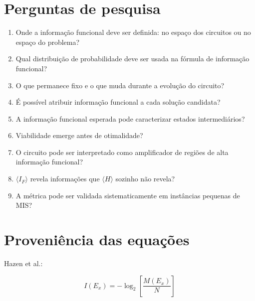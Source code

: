 \documentclass[11pt,a4paper]{article}
\begin{document}
\section{Perguntas de pesquisa}

\begin{enumerate}[leftmargin=1.6em]

    \item Onde a informação funcional deve ser definida:
    no espaço dos circuitos ou no espaço do problema?

    \item Qual distribuição de probabilidade deve ser usada
    na fórmula de informação funcional?

    \item O que permanece fixo e o que muda durante
    a evolução do circuito?

    \item É possível atribuir informação funcional
    a cada solução candidata?

    \item A informação funcional esperada pode caracterizar
    estados intermediários?

    \item Viabilidade emerge antes de otimalidade?

    \item O circuito pode ser interpretado como amplificador
    de regiões de alta informação funcional?

    \item $\langle I_F\rangle$ revela informações que
    $\langle H\rangle$ sozinho não revela?

    \item A métrica pode ser validada sistematicamente
    em instâncias pequenas de MIS?

\end{enumerate}

\section*{Proveniência das equações}

\begin{definitionbox}

Hazen et al.:

\[
\boxed{
I(E_x)
=
-\log_2
\left[
\frac{
M(E_x)
}{
N
}
\right]
}
\]

\end{definitionbox}
\end{document}
